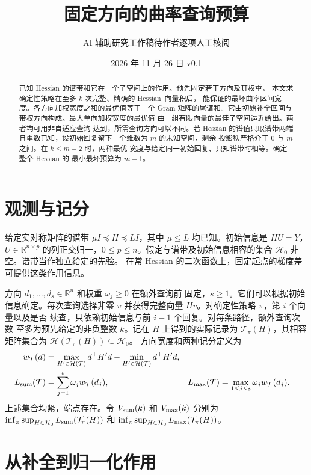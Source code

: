 \documentclass[UTF8,11pt,fontset=windows]{ctexart}
\title{固定方向的曲率查询预算}
\author{\small AI 辅助研究工作稿\quad 待作者逐项人工核阅}
\date{2026 年 11 月 26 日 \quad v0.1}
\newcommand{\R}{\mathbb{R}}
\newcommand{\Hcal}{\mathcal H}
\newcommand{\Tcal}{\mathcal T}
\begin{document}
\maketitle
\begin{abstract}
已知 Hessian 的谱带和它在一个子空间上的作用。预先固定若干方向及其权重，
本文求确定性策略在至多 \(k\) 次完整、精确的 Hessian--向量积后，
能保证的最坏曲率区间宽度。各方向加权宽度之和的最优值等于一个 Gram 矩阵的尾谱和。它由初始补全区间与带权方向构成。最大单向加权宽度的最优值
由一组有限向量的最佳子空间逼近给出。两者均可用非自适应查询
达到，所需查询方向可以不同。若 Hessian 的谱值只取谱带两端
且重数已知，设初始回复留下一个维数为 \(m\) 的未知空间，剩余
投影秩严格介于 \(0\) 与 \(m\) 之间。在 \(k\le m-2\) 时，两种最优
宽度与给定同一初始回复、只知谱带时相等。确定整个 Hessian 的
最小最坏预算为 \(m-1\)。
\end{abstract}

\section{观测与记分}

给定实对称矩阵的谱带 \(\mu I\preceq H\preceq LI\)，其中
\(\mu\le L\) 均已知。初始信息是 \(HU=Y\)，\(U\in\R^{n\times p}\)
的列正交归一，\(0\le p\le n\)。假定与谱带及初始信息相容的集合
\(\Hcal_0\) 非空。谱带当作独立给定的先验。
在常 Hessian 的二次函数上，固定起点的梯度差可提供这类作用信息。

方向 \(d_1,\ldots,d_s\in\R^n\) 和权重 \(\omega_j\ge0\) 在额外查询前
固定，\(s\ge1\)。它们可以根据初始信息确定。每次查询选择非零 \(v\)
并获得完整向量 \(Hv\)。对确定性策略 \(\pi\)，第 \(i\) 个向量以及是否
续查，只依赖初始信息与前 \(i-1\) 个回复。对每条路径，额外查询次数
至多为预先给定的非负整数 \(k\)。记在 \(H\) 上得到的实际记录为
\(\Tcal_\pi(H)\)，其相容矩阵集合为 \(\Hcal(\Tcal_\pi(H))\subseteq\Hcal_0\)。
方向宽度和两种记分定义为
\begin{align}
 w_{\Tcal}(d)
 &=\max_{H'\in\Hcal(\Tcal)} d^\top H'd
   -\min_{H'\in\Hcal(\Tcal)} d^\top H'd,\\
 L_{\rm sum}(\Tcal)&=\sum_{j=1}^s\omega_j w_{\Tcal}(d_j),
 &L_{\rm max}(\Tcal)&=\max_{1\le j\le s}\omega_j w_{\Tcal}(d_j).
\end{align}
上述集合均紧，端点存在。令 \(V_{\rm sum}(k)\) 和 \(V_{\rm max}(k)\)
分别为 \(\inf_\pi\sup_{H\in\Hcal_0} L_{\rm sum}(\Tcal_\pi(H))\)
和 \(\inf_\pi\sup_{H\in\Hcal_0} L_{\rm max}(\Tcal_\pi(H))\)。

\section{从补全到归一化作用}
\end{document}
